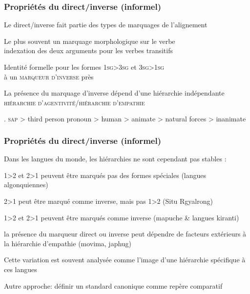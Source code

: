 \begin{frame}
\frametitle{Propriétés du direct/inverse (informel)}
\begin{blackwideitemize}
\item Le direct/inverse fait partie des types de marquages de
  l'alignement
\item Le plus souvent un marquage morphologique sur le verbe\\
\ra indexation des deux arguments pour les verbes transitifs
\item Identité formelle pour les formes \textsc{1sg>3sg} et
  \textsc{3sg>1sg}\\ à un \textsc{marqueur d'inverse} près
\item La présence du marquage d'inverse dépend d'une hiérarchie
  indépendante\\
\ra \textsc{hiérarchie d'agentivité/hiérarchie d'empathie} \cite[644]{delancey81}
\end{blackwideitemize}

\ex. \textsc{sap} > third person pronoun > human > animate > natural
forces > inanimate\label{ex:delancey}

\end{frame}

\begin{frame}
\frametitle{Propriétés du direct/inverse (informel)}
\begin{blackwideitemize}
\item Dans les langues du monde, les hiérarchies ne sont cependant pas
  stables \cite{jacques13inversecompass}:
\begin{smallwideitemize}
\item \textsc{1>2} et \textsc{2>1} peuvent être marqués pas des formes
  spéciales (langues algonquiennes)
\item \textsc{2>1} peut être marqué comme inverse, mais pas \textsc{1>2} (Situ Rgyalrong)
\item \textsc{1>2} et \textsc{2>1} peuvent être marqués comme inverse
  (mapuche \& langues kiranti)
\item la présence du marqueur direct ou inverse peut dépendre de
  facteurs extérieurs à la hiérarchie d'empathie (movima, japhug)
\end{smallwideitemize}
\item Cette variation est souvent analysée comme l'image d'une
  hiérarchie spécifique à ces langues
\pause
\item Autre approche: définir un standard canonique comme repère
  comparatif 
\end{blackwideitemize}

\end{frame}

